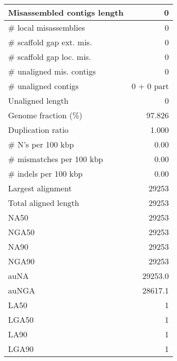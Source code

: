 \documentclass[12pt,a4paper]{article}
\begin{document}
\begin{table}[ht]
\begin{center}
\begin{tabular}{|l*{1}{|r}|}
Misassembled contigs length & 0 \\ \hline
\# local misassemblies & 0 \\ \hline
\# scaffold gap ext. mis. & 0 \\ \hline
\# scaffold gap loc. mis. & 0 \\ \hline
\# unaligned mis. contigs & 0 \\ \hline
\# unaligned contigs & 0 + 0 part \\ \hline
Unaligned length & 0 \\ \hline
Genome fraction (\%) & 97.826 \\ \hline
Duplication ratio & 1.000 \\ \hline
\# N's per 100 kbp & 0.00 \\ \hline
\# mismatches per 100 kbp & 0.00 \\ \hline
\# indels per 100 kbp & 0.00 \\ \hline
Largest alignment & 29253 \\ \hline
Total aligned length & 29253 \\ \hline
NA50 & 29253 \\ \hline
NGA50 & 29253 \\ \hline
NA90 & 29253 \\ \hline
NGA90 & 29253 \\ \hline
auNA & 29253.0 \\ \hline
auNGA & 28617.1 \\ \hline
LA50 & 1 \\ \hline
LGA50 & 1 \\ \hline
LA90 & 1 \\ \hline
LGA90 & 1 \\ \hline
\end{tabular}
\end{center}
\end{table}
\end{document}
